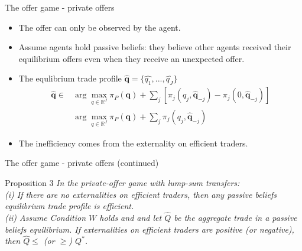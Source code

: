 \documentclass[aspectratio=169]{beamer}  %
\begin{document}
\begin{frame}{The offer game - private offers}
    \begin{itemize}
        \item The offer can only be observed by the agent. \vspace{.2cm}
        \item Assume agents hold passive beliefs: they believe other agents received their equilibrium offers even when they receive an unexpected offer. \vspace{.2cm}
        \item The equlibrium trade profile $\hat{\mathbf{q}}=\{\hat{q_1},...,\hat{q_J}\}$ 
        \begin{equation}
            \begin{aligned}
                \hat{\mathbf{q}} \in &\arg \max_{q \in \mathbb{R}^J} \pi_P(\mathbf{q}) + \sum_j [\pi_j(q_j, \hat{\mathbf{q}}_{-j}) - \pi_j(0, \hat{\mathbf{q}}_{-j})]\\
                & \arg \max_{q \in \mathbb{R}^J} \pi_P(\mathbf{q}) + \sum_j \pi_j(q_j, \hat{\mathbf{q}}_{-j})
            \end{aligned}               
        \end{equation}
        \item The inefficiency comes from the externality on efficient traders.
    \end{itemize}
\end{frame}



\begin{frame}{The offer game - private offers (continued)}
    \begin{block}{Proposition 3}
        \textit{In the private-offer game with lump-sum transfers:\\
        (i) If there are no externalities on efficient traders, then any passive beliefs equilibrium trade profile is efficient.}\\
        \textit{(ii) Assume Condition $W$ holds and and let $\hat{Q}$ be the aggregate trade in a passive beliefs equilibrium. If externalities on efficient traders are positive (or negative), then $\hat{Q} \leq$ (or $\geq$) $Q^*$.}
    \end{block}
\end{frame}
\end{document}
